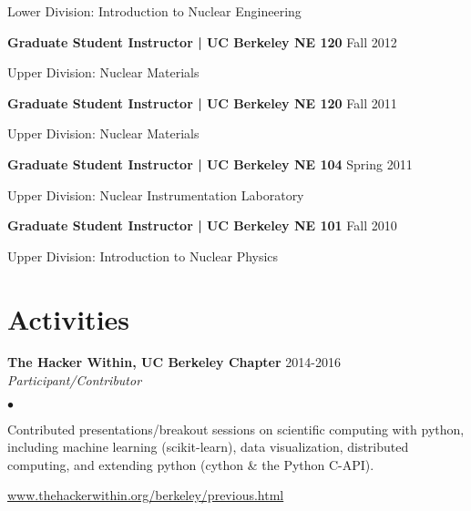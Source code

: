 \documentclass[margin,line]{res}
\newenvironment{list1}{
  \begin{list}{\ding{113}}{%
      \setlength{\itemsep}{0in}
      \setlength{\parsep}{0in} \setlength{\parskip}{0in}
      \setlength{\topsep}{0in} \setlength{\partopsep}{0in} 
      \setlength{\leftmargin}{0.17in}}}{\end{list}}
\newenvironment{list2}{
  \begin{list}{$\bullet$}{%
      \setlength{\itemsep}{0in}
      \setlength{\parsep}{0in} \setlength{\parskip}{0in}
      \setlength{\topsep}{0in} \setlength{\partopsep}{0in} 
      \setlength{\leftmargin}{0.2in}}}{\end{list}}
\begin{document}
\begin{resume}
\begin{list1}
  \item[] Lower Division: Introduction to Nuclear Engineering
\end{list1}
{\bf Graduate Student Instructor | UC Berkeley NE 120} \hfill Fall 2012

\begin{list1}
  \item[] Upper Division: Nuclear Materials
\end{list1}
{\bf Graduate Student Instructor | UC Berkeley NE 120} \hfill Fall 2011

\begin{list1}
  \item[] Upper Division: Nuclear Materials
\end{list1}
{\bf Graduate Student Instructor | UC Berkeley NE 104} \hfill Spring 2011

\begin{list1}
  \item[] Upper Division: Nuclear Instrumentation Laboratory
\end{list1}
{\bf Graduate Student Instructor | UC Berkeley NE 101} \hfill Fall 2010

\begin{list1}
  \item[] Upper Division: Introduction to Nuclear Physics
\end{list1}

\section{\sc Activities}

{\bf The Hacker Within, UC Berkeley Chapter} \hfill 2014-2016 \\ 
{\em Participant/Contributor} 

\begin{list2}
  \item Contributed presentations/breakout sessions on scientific computing
        with python, including machine learning (scikit-learn), data
        visualization, distributed computing, and extending python 
        (cython \& the Python C-API).
  \item \url{www.thehackerwithin.org/berkeley/previous.html}
\end{list2}


\end{resume}
\end{document}
